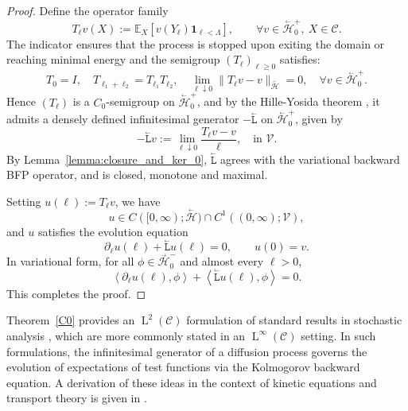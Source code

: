 \documentclass{amsart}
\newcommand{\bL}{\stackrel{_\leftarrow}{\mathtt L}}
\theoremstyle{plain}
\newcommand{\leb}{\text{Leb}}
\newcommand{\LL}{\ensuremath{\operatorname L}\xspace}
\renewcommand{\leb}[1]{\ensuremath{\LL^{#1}}}
\newcommand{\ltwop}[2]{\ensuremath{\!\left\langle{#1,#2}\right\rangle}}
\newcommand{\cH}{\stackrel{_\rightarrow}{\mathscr H}}
\newcommand{\cbH}{\stackrel{_\leftarrow}{\mathscr H}}
\newcommand{\cV}{\ensuremath{\mathscr V}}
\begin{document}
\begin{proof}
  Define the operator family
  \begin{equation}
    T_\ell v(X) := \mathbb{E}_{X}[v(Y_\ell)\mathbf{1}_{\ell < \Lambda}], \qquad \forall v \in \cbH_0^+,~ X \in \mathcal{C}.
  \end{equation}
  The indicator ensures that the process is stopped upon exiting the
  domain or reaching minimal energy and the semigroup $(T_\ell)_{\ell
    \geq 0}$ satisfies:
  \begin{equation}
    T_0 = I, \quad T_{\ell_1 + \ell_2} = T_{\ell_1} T_{\ell_2}, \quad \lim_{\ell \downarrow 0} \|T_\ell v - v\|_{\cbH} = 0, \quad \forall v \in \cbH_0^+.
  \end{equation}
  Hence $(T_\ell)$ is a $C_0$-semigroup on $\cbH_0^+$, and by the
  Hille-Yosida theorem \cite[§4.4]{brezis2011functional}, it admits a
  densely defined infinitesimal generator $-\bL$ on $\cbH_0^+$, given
  by
  \begin{equation}
    -\bL v := \lim_{\ell \downarrow 0} \frac{T_\ell v - v}{\ell}, \quad \text{in } \cV.
  \end{equation}
  By Lemma~\ref{lemma:closure_and_ker_0}, $\bL$ agrees with the
  variational backward BFP operator, and is closed, monotone and
  maximal.

  Setting $u(\ell) := T_\ell v$, we have
  \begin{equation}
    u \in C([0, \infty); \cbH) \cap C^1((0, \infty); \cV),
  \end{equation}
  and $u$ satisfies the evolution equation
  \begin{equation}
    \partial_\ell u(\ell) + \bL u(\ell) = 0, \qquad u(0) = v.
  \end{equation}
  In variational form, for all $\phi \in \cH_0^-$ and almost every $\ell > 0$,
  \begin{equation}
    \label{transitiondensity2}
    \ltwop{\partial_\ell u(\ell)}{\phi} + \ltwop{\bL u(\ell)}{\phi} = 0.
  \end{equation}
  This completes the proof.
\end{proof}

Theorem~\ref{C0} provides an $\leb{2}(\mathcal{C})$ formulation of
standard results in stochastic analysis
\cite[Chapter~8]{Oksendal2003}, which are more commonly stated in an
$\leb{\infty}(\mathcal{C})$ setting. In such formulations, the
infinitesimal generator of a diffusion process governs the evolution
of expectations of test functions via the Kolmogorov backward
equation. A derivation of these ideas in the context of kinetic
equations and transport theory is given in \cite{Pavliotis2014}.
\end{document}
